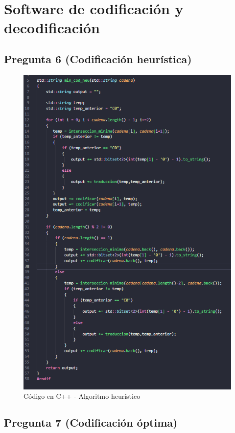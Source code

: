 \section{Software de codificación y decodificación}

\subsection{Pregunta 6 (Codificación heurística)}

\begin{figure}[H]
    \centering
    \includegraphics[scale = 0.4]{imagenes/voraz.png}
    \caption{Código en C++ - Algoritmo heurístico}
\end{figure}


\subsection{Pregunta 7 (Codificación óptima)}

